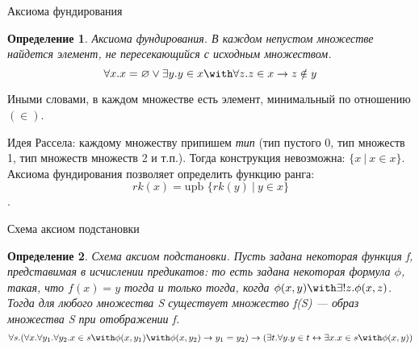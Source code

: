 \documentclass[aspectratio=169]{beamer}
\newtheorem{dfn}{Определение}[section]
\begin{document}
\begin{frame}{Аксиома фундирования}
\begin{dfn}Аксиома фундирования. 
В каждом непустом множестве найдется элемент, не пересекающийся с исходным множеством.
$$\forall x .x = \varnothing \vee \exists y .y \in x \with \forall z.z \in x \rightarrow z \notin y$$
\end{dfn}

Иными словами, в каждом множестве есть элемент, минимальный по отношению $(\in)$.

Идея Рассела: каждому множеству припишем \emph{тип} (тип пустого 0, тип множеств 1,
тип множеств множеств 2 и т.п.). Тогда конструкция невозможна: $\{ x\ |\ x \in x\}$.
Аксиома фундирования позволяет определить функцию ранга:
$$rk(x) = \text{upb }\{rk(y)\ |\ y\in x\}$$.
\end{frame}

\begin{frame}{Схема аксиом подстановки}
\begin{dfn}Схема аксиом подстановки. 
Пусть задана некоторая функция f, представимая в исчислении предикатов:
то есть задана некоторая формула $\phi$, такая, что $f(x) = y$
тогда и только тогда, когда $\phi(x,y) \with \exists ! z. \phi(x,z)$.
Тогда для любого множества S существует множество f(S) --- образ
множества S при отображении f.
$$\forall s .(\forall x .\forall y_1 .\forall y_2 .x \in s \with \phi (x,y_1) \with \phi
(x,y_2) \rightarrow y_1=y_2) \rightarrow 
(\exists t .\forall y .y \in t
\leftrightarrow \exists x . x \in s \with \phi (x,y)) $$
\end{dfn}
\end{frame}
\end{document}
